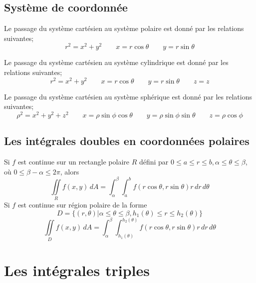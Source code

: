 	\subsection{Système de coordonnée}
		\begin{mydef}
			Le passage du système cartésien au système polaire est donné par les relations suivantes;
				\[r^2=x^2+y^2\qquad x=r\cos\theta\qquad y=r\sin\theta\]
		\end{mydef}
		\begin{mydef}
			Le passage du système cartésien au système cylindrique est donné par les relations suivantes;
			\[r^2=x^2+y^2\qquad x=r\cos\theta\qquad y=r\sin\theta\qquad z=z\]
		\end{mydef}
		\begin{mydef}
	Le passage du système cartésien au système sphérique est donné par les relations suivantes;
	\[\rho^2=x^2+y^2+z^2\qquad x=\rho\sin\phi\cos\theta\qquad y=\rho\sin\phi\sin\theta\qquad z=\rho\cos\phi\]
\end{mydef}
	\subsection{Les intégrales doubles en coordonnées polaires}
		\begin{mydef}
		Si $f$ est continue sur un rectangle polaire $R$ défini par $0\leq a\leq r\leq b,\alpha\leq\theta\leq\beta$, où $0\leq\beta -\alpha \leq 2\pi$, alors \[\iint\limits_R f(x,y)\, dA=\int_{\alpha}^{\beta}\int_a^b f(r\cos\theta,r\sin\theta)r\,dr\, d\theta\]
		Si $f$ est continue sur région polaire de la forme \[D=\big\{ (r,\theta)\lvert \alpha\leq\theta\leq\beta, h_1(\theta)\leq r \leq h_2(\theta) \big\}\]
		\[\iint\limits_D f(x,y)\, dA = \int_{\alpha}^{\beta}\int_{h_1(\theta)}^{h_2(\theta)} f(r\cos\theta,r\sin\theta)r\, dr\, d \theta\]
	\end{mydef}
\section{Les intégrales triples}